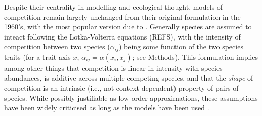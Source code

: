 \documentclass[a4paper,11pt]{article}
\begin{document}
%
Despite their centrality in modelling and ecological thought, models
of competition remain largely unchanged from their original
formulation in the 1960's, with the most popular version due to
\citet{MacArthur-1967}.
Generally species are assumed to inteact following the Lotka-Volterra
equations (REFS), with the intensity of competition between two
species ($\alpha_{ij}$) being some function of the two species traits
(for a trait axis $x$, $\alpha_{ij} = \alpha(x_i, x_j)$; see Methods).
%
This formulation implies among other things that competition is linear
in intensity with species abundances, is additive across multiple
competing species, and that the \emph{shape} of competition is an
intrinsic (i.e., not context-dependent) property of pairs of species.
%
While possibly justifiable as low-order approximations, these
assumptions have been widely criticised as long as the models have
been used
\citep[e.g.][]{Andrewartha-1953,May-1972,Abrams-1975}.
\end{document}
